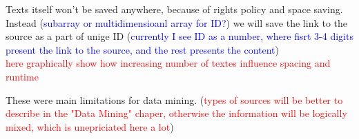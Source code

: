 \documentclass[11pt]{article}
\begin{document}
\begin{enumerate}
\begin{enumerate}
		\end{enumerate}  
Texts itself won't be saved anywhere, because of rights policy and space saving. Instead (\textcolor{blue}{subarray or multidimensioanl array for ID?}) we will save the link to the source as a part of unige ID (\textcolor{blue}{currently I see ID as a number, where fisrt 3-4 digits present the link to the source, and the rest presents the content})\\
\textcolor{red}{here graphically show how increasing number of textes influence spacing and runtime}
\end{enumerate}
These were main limitations for data mining. (\textcolor{red}{types of sources  will be better to describe in the "Data Mining" chaper, otherwise the information will be logically mixed, which is unepriciated here a lot})


\newpage
\end{document}
